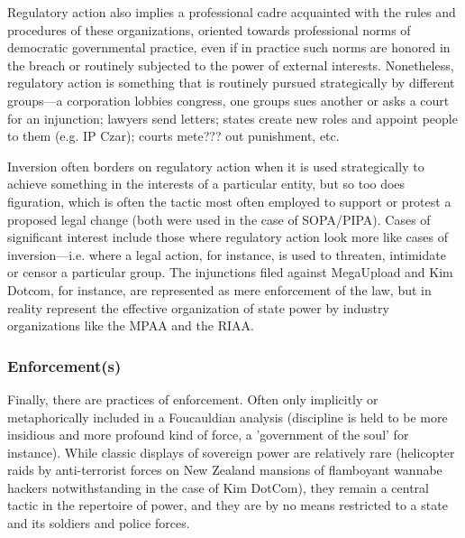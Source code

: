 \documentclass[10pt,letter,oneside]{scrartcl}
\begin{document}
Regulatory action also implies a professional cadre acquainted with the rules
and procedures of these organizations, oriented towards professional norms of
democratic governmental practice, even if in practice such norms are honored in
the breach or routinely subjected to the power of external interests.
Nonetheless, regulatory action is something that is routinely pursued
strategically by different groups---a corporation lobbies congress, one groups
sues another or asks a court for an injunction; lawyers send letters; states
create new roles and appoint people to them (e.g. IP Czar); courts mete??? out
punishment, etc.

Inversion often borders on regulatory action when it is used strategically to
achieve something in the interests of a particular entity, but so too does
figuration, which is often the tactic most often employed to support or protest
a proposed legal change (both were used in the case of SOPA/PIPA).  Cases of
significant interest include those where regulatory action look more like cases
of inversion---i.e. where a legal action, for instance, is used to threaten,
intimidate or censor a particular group. The injunctions filed against
MegaUpload and Kim Dotcom, for instance, are represented as mere enforcement of
the law, but in reality represent the effective organization of state power by
industry organizations like the MPAA and the RIAA.

\subsubsection{Enforcement(s)}

Finally, there are practices of enforcement. Often only implicitly or
metaphorically included in a Foucauldian analysis (discipline is held to be more
insidious and more profound kind of force, a 'government of the soul' for
instance).  While classic displays of sovereign power are relatively rare
(helicopter raids by anti-terrorist forces on New Zealand mansions of flamboyant
wannabe hackers notwithstanding in the case of Kim DotCom), they remain a central 
tactic in the repertoire of power, and they are by no means restricted to a 
state and its soldiers and police forces. 
\end{document}
